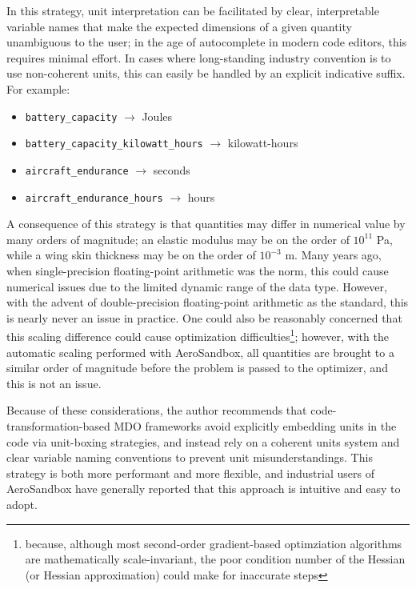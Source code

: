In this strategy, unit interpretation can be facilitated by clear, interpretable variable names that make the expected dimensions of a given quantity unambiguous to the user; in the age of autocomplete in modern code editors, this requires minimal effort. In cases where long-standing industry convention is to use non-coherent units, this can easily be handled by an explicit indicative suffix. For example:

\begin{itemize}[noitemsep]
    \item \texttt{battery_capacity} $\rightarrow$ Joules
    \item \texttt{battery_capacity_kilowatt_hours} $\rightarrow$ kilowatt-hours
    \item \texttt{aircraft_endurance} $\rightarrow$ seconds
    \item \texttt{aircraft_endurance_hours} $\rightarrow$ hours
\end{itemize}

A consequence of this strategy is that quantities may differ in numerical value by many orders of magnitude; an elastic modulus may be on the order of $10^{11}$ Pa, while a wing skin thickness may be on the order of $10^{-3}$ m. Many years ago, when single-precision floating-point arithmetic was the norm, this could cause numerical issues due to the limited dynamic range of the data type. However, with the advent of double-precision floating-point arithmetic as the standard, this is nearly never an issue in practice. One could also be reasonably concerned that this scaling difference could cause optimization difficulties\footnote{because, although most second-order gradient-based optimziation algorithms are mathematically scale-invariant, the poor condition number of the Hessian (or Hessian approximation) could make for inaccurate steps}; however, with the automatic scaling performed with AeroSandbox, all quantities are brought to a similar order of magnitude before the problem is passed to the optimizer, and this is not an issue.

Because of these considerations, the author recommends that code-transformation-based MDO frameworks avoid explicitly embedding units in the code via unit-boxing strategies, and instead rely on a coherent units system and clear variable naming conventions to prevent unit misunderstandings. This strategy is both more performant and more flexible, and industrial users of AeroSandbox have generally reported that this approach is intuitive and easy to adopt.


